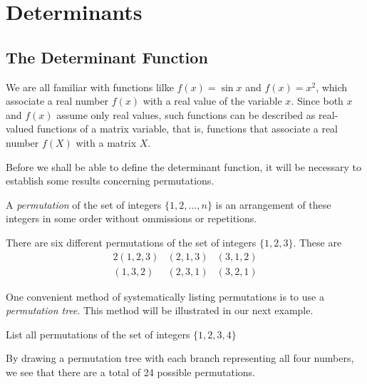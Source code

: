 
\chapter{Determinants}

\section{The Determinant Function}

We are all familiar with functions lilke $f(x) = \sin x$ and $f(x)=x^2$,
which associate a real number $f(x)$ with a real value of the variable
$x$.  Since both $x$ and $f(x)$ assume only real values, such functions
can be described as real-valued functions of a matrix variable, that is,
functions that associate a real number $f(X)$ with a matrix $X$.

Before we shall be able to define the determinant function, it will be
necessary to establish some results concerning permutations.

\begin{definition}
A {\it permutation} of the set of integers $\{1,2,\ldots,n\}$ is an
arrangement of these integers in some order without ommissions or
repetitions.
\end{definition}

\begin{example}
There are six different permutations of the set of integers $\{1,2,3\}$.
These are
%
\begin{alignat}{2}
 (1,2,3) & (2,1,3) & (3,1,2) \\
 (1,3,2) & (2,3,1) & (3,2,1)
\end{alignat}
\end{example}

One convenient method of systematically listing permutations is to use a
{\it permutation tree}.  This method will be illustrated in our next
example.

\begin{example}
List all permutations of the set of integers $\{1,2,3,4\}$

%
%
%
%

\quad
By drawing a permutation tree with each branch representing all four
numbers, we see that there are a total of 24 possible permutations.
\end{example}


